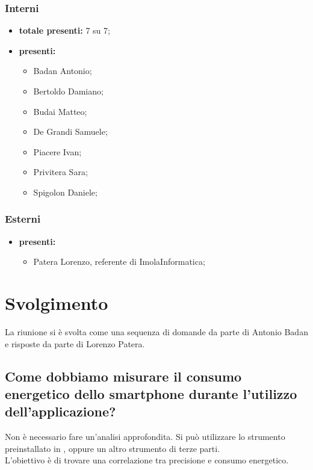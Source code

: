 \subsubsection*{Interni}
\begin{itemize}
	\item \textbf{totale presenti:} 7 su 7;
	\item \textbf{presenti: }
	\begin{itemize}
		\item Badan Antonio;
		\item Bertoldo Damiano;
		\item Budai Matteo;
		\item De Grandi Samuele;
		\item Piacere Ivan;
		\item Privitera Sara;
		\item Spigolon Daniele;
	\end{itemize}
\end{itemize}
\subsubsection*{Esterni}
\begin{itemize}
	\item \textbf{presenti: }
	\begin{itemize}
		\item Patera Lorenzo, referente di ImolaInformatica;
	\end{itemize}
\end{itemize}

\newpage

\section*{Svolgimento}
La riunione si è svolta come una sequenza di domande da parte di Antonio Badan e risposte da parte di Lorenzo Patera.

\subsection*{Come dobbiamo misurare il consumo energetico dello smartphone durante l'utilizzo dell'applicazione?}
Non è necessario fare un'analisi approfondita. Si può utilizzare lo strumento preinstallato in , oppure un altro strumento di terze parti.\\
L'obiettivo è di trovare una correlazione tra precisione e consumo energetico.

